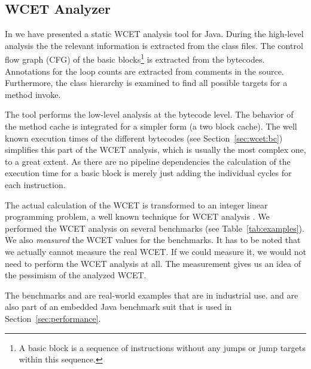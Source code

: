 \subsection{WCET Analyzer} \label{sec:wcet:java}

In \cite{jop:wcet:jtres06} we have presented a static WCET analysis
tool for Java. During the high-level analysis the the relevant
information is extracted from the class files. The control flow
graph (CFG) of the basic blocks\footnote{A basic block is a sequence
of instructions without any jumps or jump targets within this
sequence.} is extracted from the bytecodes. Annotations for the loop
counts are extracted from comments in the source. Furthermore, the
class hierarchy is examined to find all possible targets for a
method invoke.

The tool performs the low-level analysis at the bytecode level. The
behavior of the method cache is integrated for a simpler form (a two
block cache). The well known execution times of the different
bytecodes (see Section~\ref{sec:wcet:bc}) simplifies this part of
the WCET analysis, which is usually the most complex one, to a great
extent. As there are no pipeline dependencies the calculation of the
execution time for a basic block is merely just adding the
individual cycles for each instruction.

The actual calculation of the WCET is transformed to an integer
linear programming problem, a well known technique for WCET analysis
\cite{Puschner:JRTS1997,216666}. We performed the WCET analysis on
several benchmarks (see Table~\ref{tab:examples}). We also
\emph{measured} the WCET values for the benchmarks. It has to be
noted that we actually cannot measure the real WCET. If we could
measure it, we would not need to perform the WCET analysis at all.
The measurement gives us an idea of the pessimism of the analyzed
WCET.
%
\begin{table}
    \caption{WCET benchmark examples}
    \label{tab:examples}
\end{table}
%
The benchmarks  and  are real-world examples
that are in industrial use.  and  are also
part of an embedded Java benchmark suit that is used in
Section~\ref{sec:performance}.

